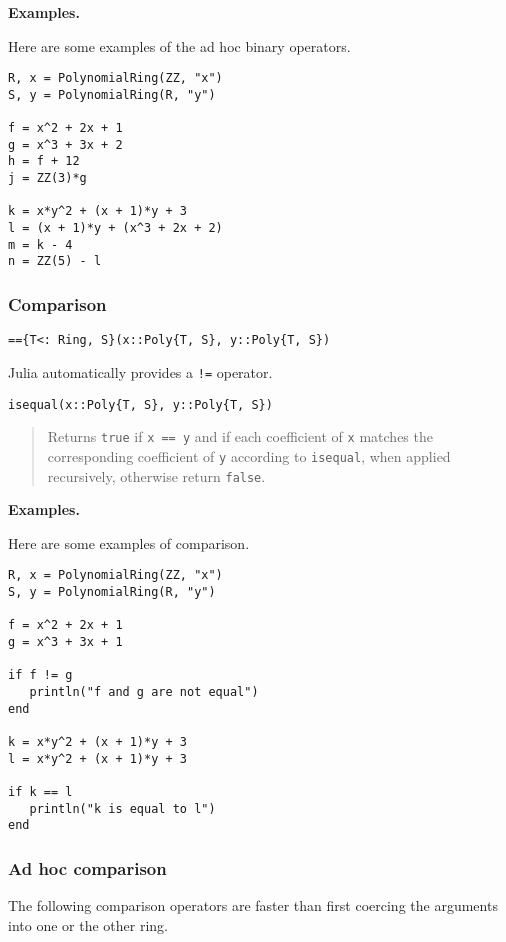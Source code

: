 \documentclass[a4paper,10pt]{article}
\newcommand{\code}{\lstinline}
\newcommand{\desc}[1]{\vspace{-3mm}\begin{quote}#1\end{quote}}
\begin{document}
{{\textbf{Examples.}

Here are some examples of the ad hoc binary operators.

\begin{lstlisting}
R, x = PolynomialRing(ZZ, "x")
S, y = PolynomialRing(R, "y")

f = x^2 + 2x + 1
g = x^3 + 3x + 2
h = f + 12
j = ZZ(3)*g

k = x*y^2 + (x + 1)*y + 3
l = (x + 1)*y + (x^3 + 2x + 2)
m = k - 4
n = ZZ(5) - l
\end{lstlisting}

\subsubsection{Comparison}

\begin{lstlisting}
=={T<: Ring, S}(x::Poly{T, S}, y::Poly{T, S})
\end{lstlisting}

Julia automatically provides a \code{!=} operator.

\begin{lstlisting}
isequal(x::Poly{T, S}, y::Poly{T, S})
\end{lstlisting}

\desc{Returns \code{true} if \code{x == y} and if each coefficient of \code{x}
matches the corresponding coefficient of \code{y} according to \code{isequal},
when applied recursively, otherwise return \code{false}.}

\textbf{Examples.}

Here are some examples of comparison.

\begin{lstlisting}
R, x = PolynomialRing(ZZ, "x")
S, y = PolynomialRing(R, "y")

f = x^2 + 2x + 1
g = x^3 + 3x + 1

if f != g
   println("f and g are not equal")
end

k = x*y^2 + (x + 1)*y + 3
l = x*y^2 + (x + 1)*y + 3

if k == l
   println("k is equal to l")
end
\end{lstlisting}

\subsubsection{Ad hoc comparison}

The following comparison operators are faster than first coercing the arguments
into one or the other ring.

}}
\end{document}
